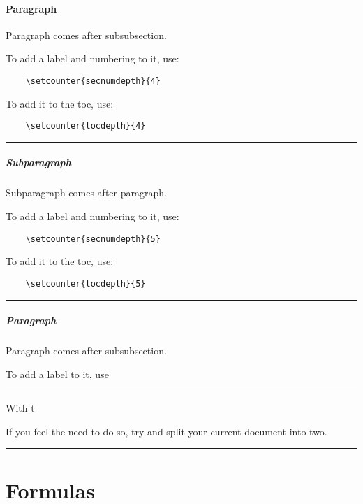 \documentclass[12pt]{article}
\begin{document}
\paragraph{Paragraph}

\begin{remark} \label{rem-paragraph}
  Paragraph comes after subsubsection.
  
  To add a label and numbering to it, use:

  \begin{lstlisting}
    \setcounter{secnumdepth}{4}
  \end{lstlisting}
  
  To add it to the toc, use:
  
  \begin{lstlisting}
    \setcounter{tocdepth}{4}
  \end{lstlisting}
  
\end{remark}\hrule
  
\subparagraph{Subparagraph}

\begin{remark} \label{rem-subparagraph}
  Subparagraph comes after paragraph.
  
  To add a label and numbering to it, use:

  \begin{lstlisting}
    \setcounter{secnumdepth}{5}
  \end{lstlisting}
  
  To add it to the toc, use:
  
  \begin{lstlisting}
    \setcounter{tocdepth}{5}
  \end{lstlisting}
  
\end{remark}\hrule

\subparagraph{Paragraph}

\begin{remark} \label{paragraph}
  Paragraph comes after subsubsection.
  
  To add a label to it, use \setcounter{secnumdepth}{4}
\end{remark}\hrule

\begin{remark} \label{remSec1}
  With t
  
  If you feel the need to do so, try and split your current document into two.
\end{remark}\hrule

\section{Formulas}\label{secForm}
\end{document}
